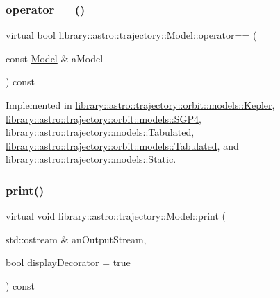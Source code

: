 \mbox{\label{classlibrary_1_1astro_1_1trajectory_1_1_model_a83c52eb23e8feea58d600c87700ed923}} 
\subsubsection{\texorpdfstring{operator==()}{operator==()}}
{\footnotesize\ttfamily virtual bool library\+::astro\+::trajectory\+::\+Model\+::operator== (\begin{DoxyParamCaption}\item[{const \hyperlink{classlibrary_1_1astro_1_1trajectory_1_1_model}{Model} \&}]{a\+Model }\end{DoxyParamCaption}) const\hspace{0.3cm}{\ttfamily [pure virtual]}}



Implemented in \hyperlink{classlibrary_1_1astro_1_1trajectory_1_1orbit_1_1models_1_1_kepler_af3adc1e4bee0a3064963209b58178e98}{library\+::astro\+::trajectory\+::orbit\+::models\+::\+Kepler}, \hyperlink{classlibrary_1_1astro_1_1trajectory_1_1orbit_1_1models_1_1_s_g_p4_a6210273bf78e8b98b310999a09d89cc4}{library\+::astro\+::trajectory\+::orbit\+::models\+::\+S\+G\+P4}, \hyperlink{classlibrary_1_1astro_1_1trajectory_1_1models_1_1_tabulated_af733fafd705bd6a1f204acdbaf2e9646}{library\+::astro\+::trajectory\+::models\+::\+Tabulated}, \hyperlink{classlibrary_1_1astro_1_1trajectory_1_1orbit_1_1models_1_1_tabulated_a7194a96e062cb6a8c109c82e169a9d7d}{library\+::astro\+::trajectory\+::orbit\+::models\+::\+Tabulated}, and \hyperlink{classlibrary_1_1astro_1_1trajectory_1_1models_1_1_static_ade92be03b036c9625bd5a4111cb69731}{library\+::astro\+::trajectory\+::models\+::\+Static}.

\mbox{\label{classlibrary_1_1astro_1_1trajectory_1_1_model_af3dd0c38fdbac0b64f689fd8c88c3320}} 
\subsubsection{\texorpdfstring{print()}{print()}}
{\footnotesize\ttfamily virtual void library\+::astro\+::trajectory\+::\+Model\+::print (\begin{DoxyParamCaption}\item[{std\+::ostream \&}]{an\+Output\+Stream,  }\item[{bool}]{display\+Decorator = {\ttfamily true} }\end{DoxyParamCaption}) const\hspace{0.3cm}{\ttfamily [pure virtual]}}



